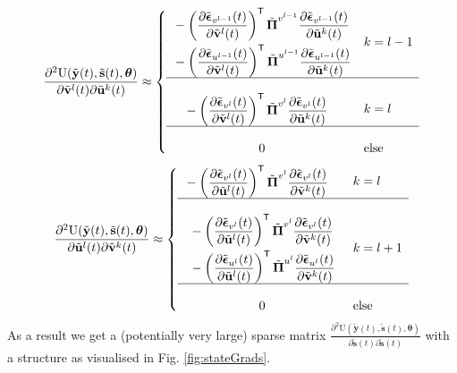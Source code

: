 \documentclass[a4paper,10pt]{article}
\newcommand{\bs}[1]{\mathbf{#1}}					%
\newcommand{\bgs}[1]{\boldsymbol{#1}}				%
\newcommand{\pd}[2]{\frac{\partial #1}{\partial #2}} 	%
\newcommand{\ppd}[3]{\frac{\partial^2 #1}{\partial #2 \partial #3}} %
\newcommand{\tr}{\mathsf{T}}				%
\newcommand{\eq}[1]{\begin{equation} #1 \end{equation}}%
\newcommand{\gc}[1]{\tilde{#1}} %
\renewcommand{\ss}{u}         %
\newcommand{\sv}{v}         %
\newcommand{\so}{y}         %
\newcommand{\st}{s}         %
\newcommand{\spe}{\epsilon} %
\renewcommand{\sp}{\theta}    %
\newcommand{\ps}{\bs{\ss}}    %
\newcommand{\pv}{\bs{\sv}}    %
\newcommand{\po}{\bs{\so}}    %
\newcommand{\pt}{\bs{\st}}     %
\newcommand{\ppe}{\bgs{\spe}} %
\newcommand{\psg}{\gc{\ps}}    %
\newcommand{\pvg}{\gc{\pv}}    %
\newcommand{\ptg}{\gc{\pt}}     %
\newcommand{\pog}{\gc{\po}}    %
\newcommand{\ppeg}{\gc{\ppe}} %
\newcommand{\pp}{\bgs{\sp}} %
\newcommand{\U}{\mathrm{U}}			%
\begin{document}
\eq{
    \ppd{\U(\pog(t),\ptg(t),\pp)}{\pvg^l(t)}{\psg^k(t)} \approx \left\{\begin{array}{cl}
         \begin{split}&- \left(\pd{\ppeg_{\sv^{l-1}}(t)}{\pvg^l(t)}\right)^\tr\gc{\bgs{\Pi}}^{\sv^{l-1}}\pd{\ppeg_{\sv^{l-1}}(t)}{\psg^k(t)}\\ &- \left(\pd{\ppeg_{\ss^{l-1}}(t)}{\pvg^l(t)}\right)^\tr\gc{\bgs{\Pi}}^{\ss^{l-1}}\pd{\ppeg_{\ss^{l-1}}(t)}{\psg^k(t)}\end{split} & k=l-1\\
         \hline\\
         \begin{split} &- \left(\pd{\ppeg_{\sv^{l}}(t)}{\pvg^l(t)}\right)^\tr\gc{\bgs{\Pi}}^{\sv^{l}}\pd{\ppeg_{\sv^{l}}(t)}{\psg^k(t)}\end{split} & k=l\\
         \hline\\
         0 & \mathrm{else}\end{array} \right.
}
\eq{\label{eq:grad2IntActDuv}
    \ppd{\U(\pog(t),\ptg(t),\pp)}{\psg^l(t)}{\pvg^k(t)} \approx \left\{\begin{array}{cl}
         \begin{split}&- \left(\pd{\ppeg_{\sv^{l}}(t)}{\psg^l(t)}\right)^\tr\gc{\bgs{\Pi}}^{\sv^{l}}\pd{\ppeg_{\sv^{l}}(t)}{\pvg^k(t)}\end{split} & k=l\\
      \hline\\
         \begin{split} &- \left(\pd{\ppeg_{\sv^{l}}(t)}{\psg^l(t)}\right)^\tr\gc{\bgs{\Pi}}^{\sv^{l}}\pd{\ppeg_{\sv^{l}}(t)}{\pvg^k(t)}\\ &- \left(\pd{\ppeg_{\ss^{l}}(t)}{\psg^l(t)}\right)^\tr\gc{\bgs{\Pi}}^{\ss^{l}}\pd{\ppeg_{\ss^{l}}(t)}{\pvg^k(t)}\end{split} & k=l+1\\
         \hline\\
         0 & \mathrm{else}\end{array} \right.
}
As a result we get a (potentially very large) sparse matrix $\ppd{\U(\pog(t),\ptg(t),\pp)}{\ptg(t)}{\ptg(t)}$ with a structure as visualised in Fig. \ref{fig:stateGrads}.
\end{document}
